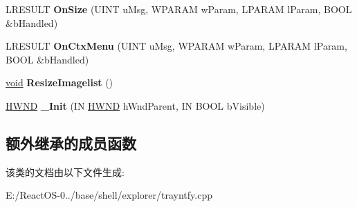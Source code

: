 \begin{DoxyCompactItemize}
L\+R\+E\+S\+U\+LT {\bfseries On\+Size} (U\+I\+NT u\+Msg, W\+P\+A\+R\+AM w\+Param, L\+P\+A\+R\+AM l\+Param, B\+O\+OL \&b\+Handled)
\item 
\mbox{\label{class_c_sys_pager_wnd_ab8f1d1cd786e7c4c1554238f55b01447}} 
L\+R\+E\+S\+U\+LT {\bfseries On\+Ctx\+Menu} (U\+I\+NT u\+Msg, W\+P\+A\+R\+AM w\+Param, L\+P\+A\+R\+AM l\+Param, B\+O\+OL \&b\+Handled)
\item 
\mbox{\label{class_c_sys_pager_wnd_a2276c955a79e6b6141025b3d94c2cf3e}} 
\hyperlink{interfacevoid}{void} {\bfseries Resize\+Imagelist} ()
\item 
\mbox{\label{class_c_sys_pager_wnd_aa53ea00e2bbb1731150eb87954616c95}} 
\hyperlink{interfacevoid}{H\+W\+ND} {\bfseries \+\_\+\+Init} (IN \hyperlink{interfacevoid}{H\+W\+ND} h\+Wnd\+Parent, IN B\+O\+OL b\+Visible)
\end{DoxyCompactItemize}
\subsection*{额外继承的成员函数}


该类的文档由以下文件生成\+:\begin{DoxyCompactItemize}
\item 
E\+:/\+React\+O\+S-\/0../base/shell/explorer/trayntfy.\+cpp\end{DoxyCompactItemize}

